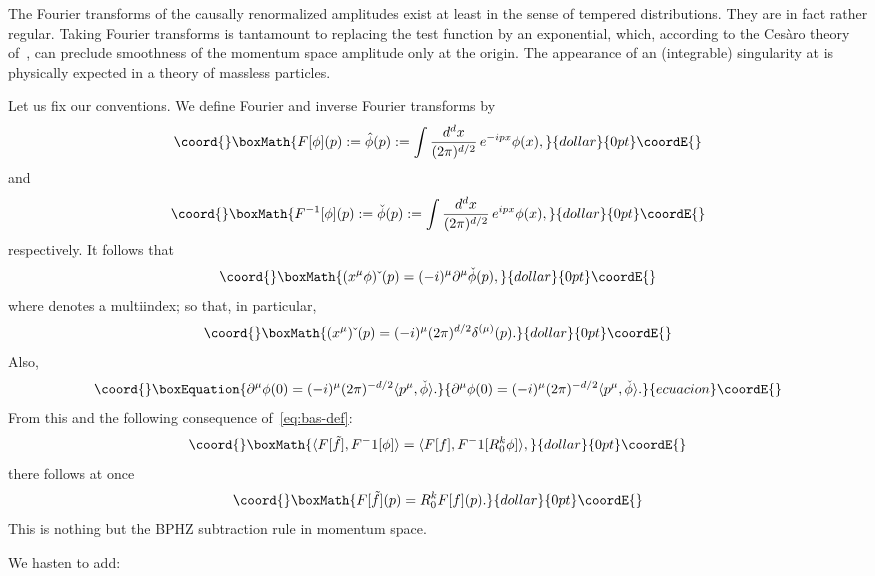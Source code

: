 \documentclass[a4paper,12pt]{article}
\providecommand{\del}{\partial}        %
\providecommand{\dl}{\delta}           %
\providecommand{\7}{\dagger}           %
\def\<#1,#2>{\langle#1,#2\rangle}  %
\theoremstyle{plain}
\theoremstyle{definition}
\begin{document}
The Fourier transforms of the causally renormalized amplitudes exist
at least in the sense of tempered distributions. They are in fact
rather regular. Taking Fourier transforms is tantamount to replacing
the test function by an exponential, which, according to the Ces\`aro
theory of~\cite{Odysseus,CesarRicardo}, can preclude smoothness of the
momentum space amplitude only at the origin. The appearance of an
(integrable) singularity at \coordHE{} is physically expected in a theory
of massless particles.

Let us fix our conventions. We define Fourier and inverse Fourier
transforms by
$$\coord{}\boxMath{
F[\phi](p) := \hat\phi(p)
:= \int \frac{d^dx}{(2\pi)^{d/2}}\, e^{-ipx} \phi(x),
}{dollar}{0pt}\coordE{}$$
and
$$\coord{}\boxMath{
F^{-1}[\phi](p) := \check\phi(p)
:= \int \frac{d^dx}{(2\pi)^{d/2}}\, e^{ipx} \phi(x),
}{dollar}{0pt}\coordE{}$$
respectively. It follows that
$$\coord{}\boxMath{
(x^\mu \phi)\check{\ }(p) = (-i)^\mu \del^\mu \check\phi(p),
}{dollar}{0pt}\coordE{}$$
where \myHighlight{$\mu$}\coordHE{} denotes a multiindex; so that, in particular,
$$\coord{}\boxMath{
(x^\mu)\check{\ }(p) = (-i)^\mu (2\pi)^{d/2} \dl^{(\mu)}(p).
}{dollar}{0pt}\coordE{}$$
Also,
\begin{equation}\coord{}\boxEquation{
\del^\mu\phi(0) = (-i)^\mu (2\pi)^{-d/2} \<p^\mu, \check\phi>.
\label{eq:acabaramos}
}{
\del^\mu\phi(0) = (-i)^\mu (2\pi)^{-d/2} \<p^\mu, \check\phi>.
}{ecuacion}\coordE{}\end{equation}
{}From this and the following consequence of~\eqref{eq:bas-def}:
$$\coord{}\boxMath{
\<F[\tilde f], F^{-1}[\phi]> = \<F[f], F^{-1}[R^k_0\phi]>,
}{dollar}{0pt}\coordE{}$$
there follows at once
$$\coord{}\boxMath{
F[\tilde f](p) = R^k_0 F[f](p).
}{dollar}{0pt}\coordE{}$$
This is nothing but the BPHZ subtraction rule in momentum space.

\smallskip

We hasten to add:
\end{document}
